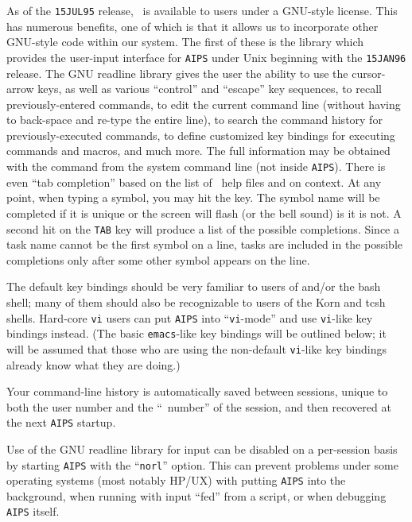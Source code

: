      As of the {\tt 15JUL95} release, \AIPS\ is available to users
under a GNU-style license.  This has numerous benefits, one of which
is that it allows us to incorporate other GNU-style code within our
system.  The first of these is the  {\tt {}}
library which provides the user-input interface for {\tt AIPS} under
Unix beginning with the {\tt 15JAN96} release. The GNU readline
library gives the user the ability to use the cursor-arrow keys, as
well as various ``control'' and ``escape'' key sequences, to recall
previously-entered commands, to edit the current command line (without
having to back-space and re-type the entire line), to search the
command history for previously-executed commands, to define customized
key bindings for executing commands and macros, and much more.  The
full information may be obtained with the command {\tt {}} from the system command line (not inside {\tt AIPS})\@.
There is even ``tab completion'' based on the list of \AIPS\ help
files and on context.  At any point, when typing a symbol, you may hit
the {\tt {}} key.  The symbol name will be completed if it is
unique or the screen will flash (or the bell sound) is it is not.  A
second hit on the {\tt TAB} key will produce a list of the possible
completions.  Since a task name cannot be the first symbol on a line,
tasks are included in the possible completions only after some other
symbol appears on the line.

     The default key bindings should be very familiar to users of
{\tt {}} and/or the bash shell; many of them should also be
recognizable to users of the Korn and tcsh shells.  Hard-core {\tt vi}
users can put {\tt AIPS} into ``{\tt vi}-mode'' and use {\tt vi}-like
key bindings instead.  (The basic {\tt emacs}-like key bindings will
be outlined below; it will be assumed that those who are using the
non-default {\tt vi}-like key bindings already know what they are
doing.)

     Your command-line history is automatically saved between
sessions, unique to both the user number and the ``\AIPS\ number'' of
the session, and then recovered at the next {\tt AIPS} startup.

     Use of the GNU readline library for input can be disabled on a
per-session basis by starting {\tt AIPS} with the ``{\tt norl}''
option.  This can prevent problems under some operating systems (most
notably HP/UX) with putting {\tt AIPS} into the background, when
running with input ``fed'' from a script, or when debugging {\tt AIPS}
itself.

